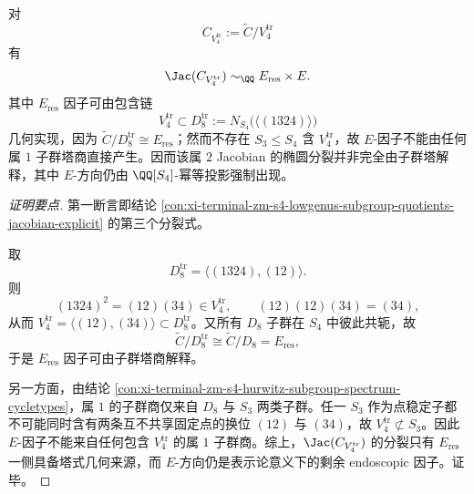\begin{conclusion}\label{con:xi-terminal-zm-s4-v4tr-splitting-partial-tower-visibility}
对
\[
C_{V_4^{\mathrm{tr}}}:=\widetilde C/V_4^{\mathrm{tr}}
\]
有
\[
\Jac(C_{V_4^{\mathrm{tr}}})\sim_{\QQ}E_{\mathrm{res}}\times E.
\]
其中 \(E_{\mathrm{res}}\) 因子可由包含链
\[
V_4^{\mathrm{tr}}\subset D_8^{\mathrm{tr}}:=N_{S_4}\!\bigl(\langle(1324)\rangle\bigr)
\]
几何实现，因为 \(\widetilde C/D_8^{\mathrm{tr}}\cong E_{\mathrm{res}}\)；然而不存在 \(S_3\le S_4\) 含 \(V_4^{\mathrm{tr}}\)，故 \(E\)-因子不能由任何属 \(1\) 子群塔商直接产生。因而该属 \(2\) Jacobian 的椭圆分裂并非完全由子群塔解释，其中 \(E\)-方向仍由 \(\QQ[S_4]\)-幂等投影强制出现。
\end{conclusion}
\begin{proof}[证明要点]
第一断言即结论
\ref{con:xi-terminal-zm-s4-lowgenus-subgroup-quotients-jacobian-explicit}
的第三个分裂式。

取
\[
D_8^{\mathrm{tr}}=\langle(1324),(12)\rangle.
\]
则
\[
(1324)^2=(12)(34)\in V_4^{\mathrm{tr}},\qquad
(12)(12)(34)=(34),
\]
从而 \(V_4^{\mathrm{tr}}=\langle(12),(34)\rangle\subset D_8^{\mathrm{tr}}\)。又所有 \(D_8\) 子群在 \(S_4\) 中彼此共轭，故
\[
\widetilde C/D_8^{\mathrm{tr}}\cong \widetilde C/D_8=E_{\mathrm{res}},
\]
于是 \(E_{\mathrm{res}}\) 因子可由子群塔商解释。

另一方面，由结论 \ref{con:xi-terminal-zm-s4-hurwitz-subgroup-spectrum-cycletypes}，属 \(1\) 的子群商仅来自 \(D_8\) 与 \(S_3\) 两类子群。任一 \(S_3\) 作为点稳定子都不可能同时含有两条互不共享固定点的换位 \((12)\) 与 \((34)\)，故 \(V_4^{\mathrm{tr}}\not\subset S_3\)。因此 \(E\)-因子不能来自任何包含 \(V_4^{\mathrm{tr}}\) 的属 \(1\) 子群商。综上，\(\Jac(C_{V_4^{\mathrm{tr}}})\) 的分裂只有 \(E_{\mathrm{res}}\) 一侧具备塔式几何来源，而 \(E\)-方向仍是表示论意义下的剩余 endoscopic 因子。证毕。
\end{proof}

\endinput
